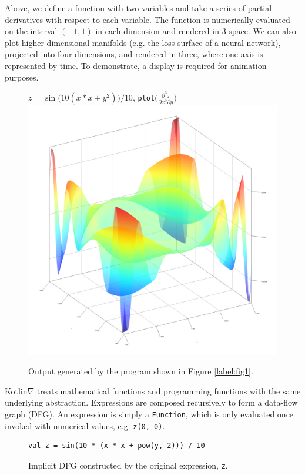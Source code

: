 \documentclass{article}
\newcommand{\squeezeup}{\vspace{-2.5mm}}
\begin{document}
\squeezeup Above, we define a function with two variables and take a series of partial derivatives with respect to each variable. The function is numerically evaluated on the interval $(-1, 1)$ in each dimension and rendered in 3-space. We can also plot higher dimensional manifolds (e.g. the loss surface of a neural network), projected into four dimensions, and rendered in three, where one axis is represented by time. To demonstrate, a display is required for animation purposes.

\squeezeup\begin{figure}[!htb]
\centering $z = \sin{\big(10(x*x + y^2)\big)} / 10$, \texttt{plot}$\Big(\frac{\partial^3z}{\partial{x^2}\partial{y}}\Big)$
\includegraphics[scale=0.43]{plot_result.png}
\squeezeup\caption{Output generated by the program shown in Figure \ref{label:fig1}.}\squeezeup
\end{figure}

Kotlin$\nabla$ treats mathematical functions and programming functions with the same underlying abstraction. Expressions are composed recursively to form a data-flow graph (DFG). An expression is simply a \texttt{Function}, which is only evaluated once invoked with numerical values, e.g. \texttt{z(0, 0)}.

\squeezeup\begin{figure}[!htb]
\begin{verbatim}
val z = sin(10 * (x * x + pow(y, 2))) / 10
\end{verbatim}
\squeezeup\centering
{}
\squeezeup\squeezeup\squeezeup\caption{Implicit DFG constructed by the original expression, \texttt{z}.}
\end{figure}
\end{document}
